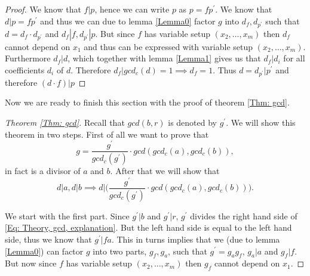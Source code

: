 \begin{proof}
  We know that $f|p$, hence we can write $p$ as $p=fp^\prime$. We know that $d|p=fp^\prime$ and thus we can due to lemma \ref{Lemma0} factor $g$ into $d_f,d_{p^\prime}$ such that $d=d_f\cdot d_{p^\prime}$ and $d_f|f,d_{p^\prime}|p$. But since $f$ has variable setup $(x_2,\ldots,x_m)$ then $d_f$ cannot depend on $x_1$ and thus can be expressed with variable setup $(x_2,\ldots,x_m)$. Furthermore $d_f|d$, which together with lemma \ref{Lemma1} gives us that $d_f|d_i$ for all coefficients $d_i$ of $d$. Therefore $d_f|gcd_c(d)=1\implies d_f=1$. Thus $d=d_{p^\prime}|p^\prime$ and therefore $(d\cdot f)|p$
\end{proof}
Now we are ready to finish this section with the proof of theorem \ref{Thm: gcd}.
\begin{proof}[Theorem \ref{Thm: gcd}]
  Recall that $gcd(b,r)$ is denoted by $g^\prime$. We will show this theorem in two steps. First of all we want to prove that
  \begin{equation}
    g=\frac{g^\prime}{gcd_c(g^\prime)}\cdot gcd(gcd_c(a),gcd_c(b)),
  \end{equation}
  in fact is a divisor of $a$ and $b$. After that we will show that
  \begin{equation}
    d|a, d|b \implies d\Big|\Big(\frac{g^\prime}{gcd_c(g^\prime)}\cdot gcd(gcd_c(a),gcd_c(b))\Big).
  \end{equation}

  We start with the first part. Since $g^\prime|b$ and $g^\prime|r$, $g^\prime$ divides the right hand side of \ref{Eq: Theory, gcd, explanation}. But the left hand side is equal to the left hand side, thus we know that $g^\prime|fa$. This in turns implies that we (due to lemma \ref{Lemma0}) can factor $g$ into two parts, $g_f,g_a$, such that $g^\prime=g_ag_f$, $g_a|a$ and $g_f|f$. But now since $f$ has variable setup $(x_2,\ldots,x_m)$ then $g_f$ cannot depend on $x_1$.


\end{proof}
